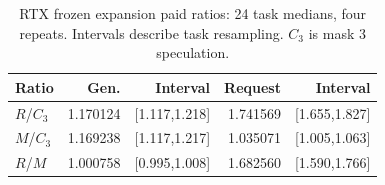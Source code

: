 \begin{table}[ht]\centering\small
\caption{RTX frozen expansion paid ratios: 24 task medians, four repeats. Intervals describe task resampling. $C_3$ is mask 3 speculation.}\label{tab:rtx_cost}
\begin{tabular}{@{}lrrrr@{}}\toprule
Ratio & Gen. & Interval & Request & Interval\\\midrule
$R$/$C_3$ & 1.170124 & [1.117,1.218] & 1.741569 & [1.655,1.827]\\
$M$/$C_3$ & 1.169238 & [1.117,1.217] & 1.035071 & [1.005,1.063]\\
$R$/$M$ & 1.000758 & [0.995,1.008] & 1.682560 & [1.590,1.766]\\
\bottomrule\end{tabular}

\end{table}
